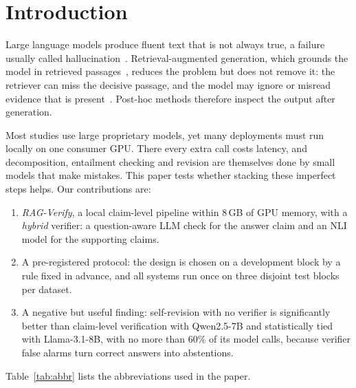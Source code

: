 \documentclass{svproc}
\begin{document}
\section{Introduction}
Large language models produce fluent text that is not always true, a failure usually called hallucination~\cite{huang2023survey}. Retrieval-augmented generation, which grounds the model in retrieved passages~\cite{lewis2020rag}, reduces the problem but does not remove it: the retriever can miss the decisive passage, and the model may ignore or misread evidence that is present~\cite{niu2023ragtruth}. Post-hoc methods therefore inspect the output after generation.

Most studies use large proprietary models, yet many deployments must run locally on one consumer GPU. There every extra call costs latency, and decomposition, entailment checking and revision are themselves done by small models that make mistakes. This paper tests whether stacking these imperfect steps helps. Our contributions are:
\begin{enumerate}
\item \emph{RAG-Verify}, a local claim-level pipeline within 8\,GB of GPU memory, with a \emph{hybrid} verifier: a question-aware LLM check for the answer claim and an NLI model for the supporting claims.
\item A pre-registered protocol: the design is chosen on a development block by a rule fixed in advance, and all systems run once on three disjoint test blocks per dataset.
\item A negative but useful finding: self-revision with no verifier is significantly better than claim-level verification with Qwen2.5-7B and statistically tied with Llama-3.1-8B, with no more than 60\% of its model calls, because verifier false alarms turn correct answers into abstentions.
\end{enumerate}
Table~\ref{tab:abbr} lists the abbreviations used in the paper.
\end{document}
